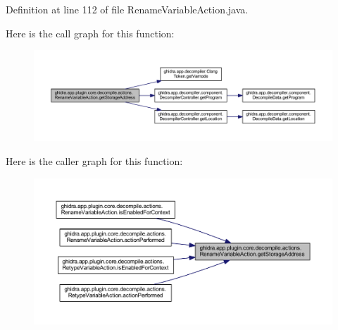 Definition at line 112 of file Rename\+Variable\+Action.\+java.

Here is the call graph for this function\+:
\nopagebreak
\begin{figure}[H]
\begin{center}
\leavevmode
\includegraphics[width=350pt]{classghidra_1_1app_1_1plugin_1_1core_1_1decompile_1_1actions_1_1_rename_variable_action_a53116a7c562ce55a51d92040128854aa_cgraph}
\end{center}
\end{figure}
Here is the caller graph for this function\+:
\nopagebreak
\begin{figure}[H]
\begin{center}
\leavevmode
\includegraphics[width=350pt]{classghidra_1_1app_1_1plugin_1_1core_1_1decompile_1_1actions_1_1_rename_variable_action_a53116a7c562ce55a51d92040128854aa_icgraph}
\end{center}
\end{figure}
\mbox{\label{classghidra_1_1app_1_1plugin_1_1core_1_1decompile_1_1actions_1_1_rename_variable_action_aae5f9e84106ddcf6bd573595dd9b219f}} 
